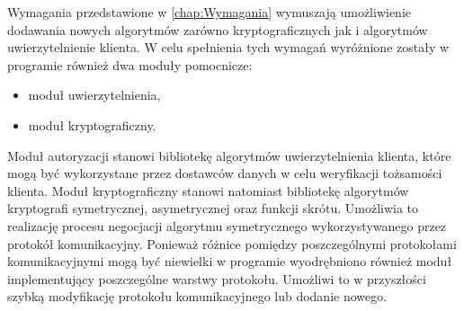 
Wymagania przedstawione w \ref{chap:Wymagania} wymuszają umożliwienie
dodawania nowych algorytmów zarówno kryptograficznych jak i algorytmów
uwierzytelnienie klienta. W celu spełnienia tych wymagań wyróżnione
zostały w programie również dwa moduły pomocnicze:

\begin{itemize}
\item moduł uwierzytelnienia,
\item moduł kryptograficzny.
\end{itemize}

Moduł autoryzacji stanowi bibliotekę algorytmów uwierzytelnienia
klienta, które mogą być wykorzystane przez dostawców danych w celu
weryfikacji tożsamości klienta. Moduł kryptograficzny stanowi
natomiast bibliotekę algorytmów kryptografi symetrycznej,
asymetrycznej oraz funkcji skrótu. Umożliwia to realizację procesu
negocjacji algorytmu symetrycznego wykorzystywanego przez protokół
komunikacyjny. Ponieważ różnice pomiędzy poszczególnymi protokołami
komunikacyjnymi mogą być niewielki w programie wyodrębniono również
moduł implementujący poszczególne warstwy protokołu. Umożliwi to w
przyszłości szybką modyfikację protokołu komunikacyjnego lub dodanie
nowego.

